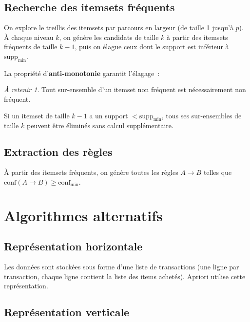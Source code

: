\documentclass[a4paper,11pt]{article}
\theoremstyle{definition}
\theoremstyle{remark}
\newtheorem*{important}{\`A retenir}
\begin{document}
\subsection{Recherche des itemsets fr\'equents}

On explore le treillis des itemsets par parcours en largeur (de
taille 1 jusqu'\`a $p$). \`A chaque niveau $k$, on g\'en\`ere les
candidats de taille $k$ \`a partir des itemsets fr\'equents de
taille $k-1$, puis on \'elague ceux dont le support est inf\'erieur
\`a $\text{supp}_{\min}$.

La propri\'et\'e d'\textbf{anti-monotonie} garantit l'\'elagage~:
\begin{important}
  Tout sur-ensemble d'un itemset non fr\'equent est n\'ecessairement
  non fr\'equent.
\end{important}

Si un itemset de taille $k-1$ a un support $< \text{supp}_{\min}$,
tous ses sur-ensembles de taille $k$ peuvent \^etre \'elimin\'es
sans calcul suppl\'ementaire.

\subsection{Extraction des r\`egles}

\`A partir des itemsets fr\'equents, on g\'en\`ere toutes les
r\`egles $A \rightarrow B$ telles que
$\text{conf}(A \rightarrow B) \geq \text{conf}_{\min}$.

\section{Algorithmes alternatifs}

\subsection{Repr\'esentation horizontale}

Les donn\'ees sont stock\'ees sous forme d'une liste de transactions
(une ligne par transaction, chaque ligne contient la liste des items
achet\'es). Apriori utilise cette repr\'esentation.

\subsection{Repr\'esentation verticale}
\end{document}
